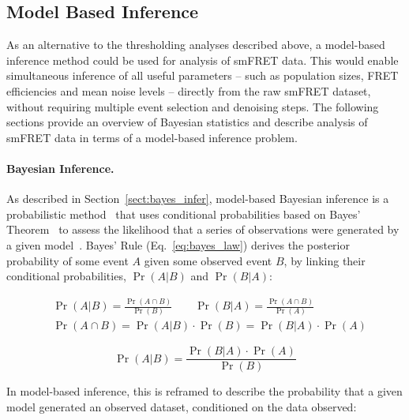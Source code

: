 
\subsection{Model Based Inference}
\label{sect:model_based_inference}
As an alternative to the thresholding analyses described above, a model-based inference method could be used for analysis of smFRET data. This would enable simultaneous inference of all useful parameters -- such as population sizes, FRET efficiencies and mean noise levels -- directly from the raw smFRET dataset, without requiring multiple event selection and denoising steps. The following sections provide an overview of Bayesian statistics and describe analysis of smFRET data in terms of a model-based inference problem. 

\paragraph{Bayesian Inference.}
As described in Section~\ref{sect:bayes_infer}, model-based Bayesian inference is a probabilistic method~\cite{barber12} that uses conditional probabilities based on Bayes' Theorem~\cite{bayes63} to assess the likelihood that a series of observations were generated by a given model~\cite{mackay03}. Bayes' Rule (Eq.~\ref{eq:bayes_law}) derives the posterior probability of some event $A$ given some observed event $B$,  by linking their conditional probabilities, $\Pr(A|B)$ and $\Pr(B|A)$: 

\begin{equation}
\begin{aligned}
& \Pr(A|B) = \frac{\Pr(A \cap B)}{\Pr(B)} \qquad \Pr(B|A) = \frac{\Pr(A \cap B)}{\Pr(A)} \\
& \Pr(A \cap B) = \Pr(A|B) \cdot \Pr(B) = \Pr(B|A) \cdot \Pr(A)
\end{aligned}
\label{eq:conditional}
\end{equation} 

\begin{equation}
\Pr(A|B) = \frac{\Pr(B|A) \cdot \Pr(A)}{\Pr(B)} 
\label{eq:bayes_law}
\end{equation}

In model-based inference, this is reframed to describe the probability that a given model generated an observed dataset, conditioned on the data observed:


